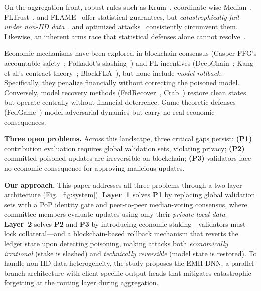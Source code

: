 \documentclass[conference]{IEEEtran}
\begin{document}
On the aggregation front, robust rules such as Krum~\cite{blanchard2017krum}, coordinate-wise Median~\cite{yin2018byzantine}, FLTrust~\cite{cao2021fltrust}, and FLAME~\cite{nguyen2022flame} offer statistical guarantees, but \emph{catastrophically fail under non-IID data}~\cite{huang2024federated, karimireddy2022bucketing}, and optimized attacks~\cite{fang2020local, baruch2019little} consistently circumvent them. Likewise, an inherent arms race that statistical defenses alone cannot resolve~\cite{karimireddy2021history}.

Economic mechanisms have been explored in blockchain consensus (Casper FFG's accountable safety~\cite{buterin2019casper}; Polkadot's slashing~\cite{wood2014polkadot}) and FL incentives (DeepChain~\cite{weng2021deepchain}; Kang et al.'s contract theory~\cite{kang2019incentive}; BlockFLA~\cite{desai2021blockfla}), but none include \emph{model rollback}. Specifically, they penalize financially without correcting the poisoned model. Conversely, model recovery methods (FedRecover~\cite{cao2023fedrecover}, Crab~\cite{jiang2024crab}) restore clean states but operate centrally without financial deterrence. Game-theoretic defenses (FedGame~\cite{wu2023fedgame}) model adversarial dynamics but carry no real economic consequences.

\textbf{Three open problems.} Across this landscape, three critical gaps persist: \textbf{(P1)} contribution evaluation requires global validation sets, violating privacy; \textbf{(P2)} committed poisoned updates are irreversible on blockchain; \textbf{(P3)} validators face no economic consequence for approving malicious updates.

\textbf{Our approach.} This paper addresses all three problems through a two-layer architecture (Fig.~\ref{fig:system}). \textbf{Layer~1} solves \textbf{P1} by replacing global validation sets with a PoP identity gate and peer-to-peer median-voting consensus, where committee members evaluate updates using only their \emph{private local data}. \textbf{Layer~2} solves \textbf{P2} and \textbf{P3} by introducing economic staking---validators must lock collateral---and a blockchain-based rollback mechanism that reverts the ledger state upon detecting poisoning, making attacks both \emph{economically irrational} (stake is slashed) and \emph{technically reversible} (model state is restored). To handle non-IID data heterogeneity, the study proposes the EMH-DNN, a parallel-branch architecture with client-specific output heads that mitigates catastrophic forgetting at the routing layer during aggregation.
\end{document}
